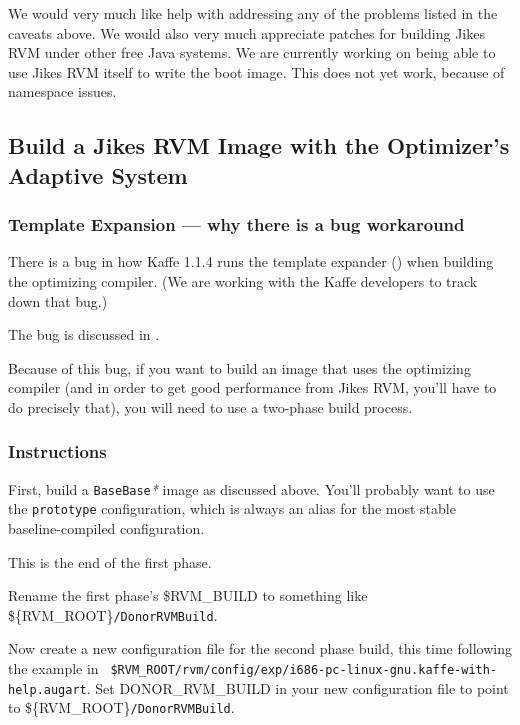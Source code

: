 We would very much like help with addressing any of the problems
listed in the caveats above.  We would also very much appreciate
patches for building Jikes RVM under other free Java systems.  We are
currently working on being able to use Jikes RVM itself to write the
boot image.  This does not yet work, because of namespace issues.

\subsection{Build a Jikes RVM Image with the Optimizer's Adaptive System}

\subsubsection{Template Expansion --- why there is a bug workaround}

  There is a bug in how Kaffe 1.1.4 runs the template expander (\gft)
  when building the \jrvm{} optimizing compiler.  (We are working with
  the Kaffe developers to track down that bug.)

  The bug is discussed in 
  .


Because of this bug, if you want to build an image that uses the
optimizing compiler (and in order to get good performance from Jikes
RVM, you'll have to do precisely that), you will need to use a
two-phase build process.

\subsubsection{Instructions}

First, build a \texttt{BaseBase}\textit{*} image as discussed above.
You'll probably want to use the \texttt{prototype} configuration,
which is always an alias for the most stable baseline-compiled
configuration.  

This is the end of the first phase.

Rename the first phase's \${RVM\_BUILD} to something like
\$\{RVM\_ROOT\}\texttt{/DonorRVMBuild}.    

Now create a new configuration file for the second phase build, this
time following the example in {\tt
\$RVM\_\-ROOT/rvm/config/exp/i686-pc-linux-gnu.kaffe-with-help.augart}.    
Set DONOR\_RVM\_BUILD in your new configuration file to point to
\$\{RVM\_ROOT\}\texttt{/DonorRVMBuild}.    

